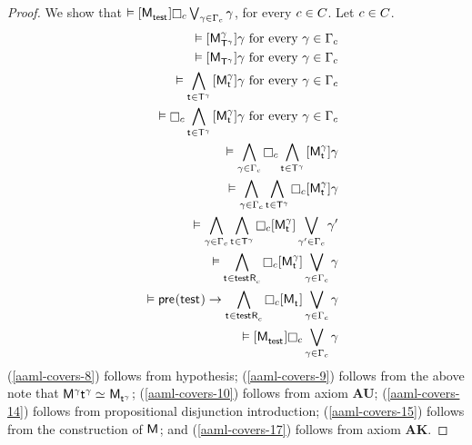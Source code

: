 \begin{proof}
We show that $\entails \actionA{\aPModel{\aStateTest}} \necessaryC \bigvee_{\gamma \in \Gamma_\agentC} \gamma$, for every $c \in C$.
Let $c \in C$.
\begin{eqnarray}
    && \entails \actionA{\aPModel[\gamma]{\aStatesT[\gamma]}} \gamma \text{ for every } \gamma \in \Gamma_\agentC \label{aaml-covers-8}\\
    && \entails \actionA{\aPModel{\aStatesT[\gamma]}} \gamma \text{ for every } \gamma \in \Gamma_\agentC \label{aaml-covers-9}\\
    && \entails \bigwedge_{\aStateT \in \aStatesT[\gamma]} \actionA{\aPModel[\gamma]{\aStateT}} \gamma \text{ for every } \gamma \in \Gamma_\agentC \label{aaml-covers-10}\\
    && \entails \necessaryC \bigwedge_{\aStateT \in \aStatesT[\gamma]} \actionA{\aPModel[\gamma]{\aStateT}} \gamma \text{ for every } \gamma \in \Gamma_\agentC \label{aaml-covers-11}\\
    && \entails \bigwedge_{\gamma \in \Gamma_\agentC} \necessaryC \bigwedge_{\aStateT \in \aStatesT[\gamma]} \actionA{\aPModel[\gamma]{\aStateT}} \gamma \label{aaml-covers-12}\\
    && \entails \bigwedge_{\gamma \in \Gamma_\agentC} \bigwedge_{\aStateT \in \aStatesT[\gamma]} \necessaryC \actionA{\aPModel[\gamma]{\aStateT}} \gamma \label{aaml-covers-13}\\
    && \entails \bigwedge_{\gamma \in \Gamma_\agentC} \bigwedge_{\aStateT \in \aStatesT[\gamma]} \necessaryC \actionA{\aPModel[\gamma]{\aStateT}} \bigvee_{\gamma' \in \Gamma_\agentC} \gamma' \label{aaml-covers-14}\\
    && \entails \bigwedge_{\aStateT \in \aSuccessorsC{\aStateTest}} \necessaryC \actionA{\aPModel[\gamma]{\aStateT}} \bigvee_{\gamma \in \Gamma_\agentC} \gamma \label{aaml-covers-15}\\
    && \entails \aPrecondition(\aStateTest) \implies \bigwedge_{\aStateT \in \aSuccessorsC{\aStateTest}} \necessaryC \actionA{\aPModel{\aStateT}} \bigvee_{\gamma \in \Gamma_\agentC} \gamma \label{aaml-covers-16}\\
    && \entails \actionA{\aPModel{\aStateTest}} \necessaryC \bigvee_{\gamma \in \Gamma_\agentC} \gamma \label{aaml-covers-17}
\end{eqnarray}
(\ref{aaml-covers-8}) follows from hypothesis;
(\ref{aaml-covers-9}) follows from the above note that $\aModel[\gamma]{\aStateT[\gamma]} \bisimilar \aPModel{\aStateT[\gamma]}$;
(\ref{aaml-covers-10}) follows from \axiomAamlK{} axiom {\bf AU};
(\ref{aaml-covers-14}) follows from propositional disjunction introduction;
(\ref{aaml-covers-15}) follows from the construction of $\aModel$; and
(\ref{aaml-covers-17}) follows from \axiomAamlK{} axiom {\bf AK}.


\end{proof}
